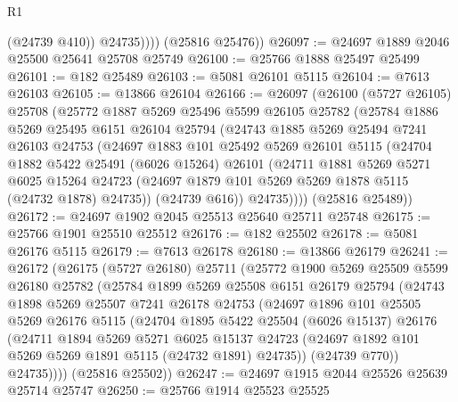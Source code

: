 \begin{lexlean}{R1}
\begin{coremodule}
                (@24739 @410))
              @24735))))
      (@25816 @25476))
@26097 := @24697 @1889 @2046 @25500 @25641 @25708 @25749
@26100 := @25766 @1888 @25497 @25499
@26101 := @182 @25489
@26103 := @5081 @26101 @5115
@26104 := @7613 @26103
@26105 := @13866 @26104
@26166 := @26097
    (@26100
      (@5727 @26105)
      @25708
      (@25772
        @1887
        @5269
        @25496
        @5599
        @26105
        @25782
        (@25784
          @1886
          @5269
          @25495
          @6151
          @26104
          @25794
          (@24743
            @1885
            @5269
            @25494
            @7241
            @26103
            @24753
            (@24697
              @1883
              @101
              @25492
              @5269
              @26101
              @5115
              (@24704
                @1882
                @5422
                @25491
                (@6026 @15264)
                @26101
                (@24711
                  @1881
                  @5269
                  @5271
                  @6025
                  @15264
                  @24723
                  (@24697 @1879 @101 @5269 @5269 @1878 @5115 (@24732 @1878) @24735))
                (@24739 @616))
              @24735))))
      (@25816 @25489))
@26172 := @24697 @1902 @2045 @25513 @25640 @25711 @25748
@26175 := @25766 @1901 @25510 @25512
@26176 := @182 @25502
@26178 := @5081 @26176 @5115
@26179 := @7613 @26178
@26180 := @13866 @26179
@26241 := @26172
    (@26175
      (@5727 @26180)
      @25711
      (@25772
        @1900
        @5269
        @25509
        @5599
        @26180
        @25782
        (@25784
          @1899
          @5269
          @25508
          @6151
          @26179
          @25794
          (@24743
            @1898
            @5269
            @25507
            @7241
            @26178
            @24753
            (@24697
              @1896
              @101
              @25505
              @5269
              @26176
              @5115
              (@24704
                @1895
                @5422
                @25504
                (@6026 @15137)
                @26176
                (@24711
                  @1894
                  @5269
                  @5271
                  @6025
                  @15137
                  @24723
                  (@24697 @1892 @101 @5269 @5269 @1891 @5115 (@24732 @1891) @24735))
                (@24739 @770))
              @24735))))
      (@25816 @25502))
@26247 := @24697 @1915 @2044 @25526 @25639 @25714 @25747
@26250 := @25766 @1914 @25523 @25525

\end{coremodule}
\end{lexlean}
